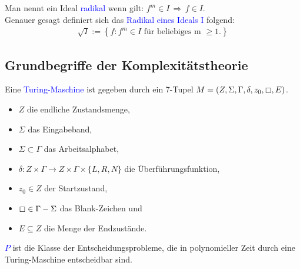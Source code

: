 \begin{definition} \label{Radikal}
Man nennt ein Ideal \textcolor{blue}{radikal} wenn gilt: $f^m \in I \, \Rightarrow \, f \in I$. \\
Genauer gesagt definiert sich das \textcolor{blue}{Radikal eines Ideals I} folgend: 
\begin{align*}
\sqrt{I} := \left\{f: f^m \in  I \text{ für beliebiges m } \ge 1.\right\}
\end{align*}
\end{definition}


\subsection{Grundbegriffe der Komplexitätstheorie}

\begin{definition}
Eine \textcolor{blue}{Turing-Maschine} ist gegeben durch ein 7-Tupel $M =(Z,\Sigma,\Gamma,\delta,z_0,\boxempty,E)$. \cite{Kompl1}
\begin{itemize}
\item $Z$ die endliche Zustandsmenge,
\item $\Sigma$ das Eingabeband,
\item $\Sigma \subset \Gamma$ das Arbeitsalphabet,
\item $\delta: Z \times \Gamma \rightarrow Z \times \Gamma \times \{L,R,N\}$ die Überführungsfunktion,
\item $z_0 \in Z$ der Startzustand,
\item $\boxempty \in \Gamma - \Sigma$ das Blank-Zeichen und 
\item $E \subseteq Z$ die Menge der Endzustände.
\end{itemize}
\end{definition}

\begin{definition}
\textcolor{blue}{$P$} ist die Klasse der Entscheidungsprobleme, die in polynomieller Zeit durch eine Turing-Maschine entscheidbar sind. \cite{Kompl1}
\end{definition}

